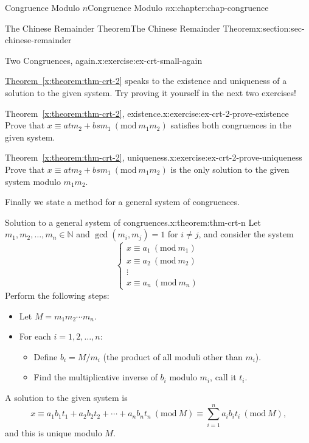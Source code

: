 \documentclass[oneside,10pt,]{book}
\newcommand{\xreffont}{\relax}
\numberwithin{equation}{section}
\newcommand{\Mod}[1]{\ \left(\mathrm{mod}\ #1\right)}
\begin{document}
\begin{chapterptx}{Congruence Modulo \(n\)}{}{Congruence Modulo \(n\)}{}{}{x:chapter:chap-congruence}
\begin{sectionptx}{The Chinese Remainder Theorem}{}{The Chinese Remainder Theorem}{}{}{x:section:sec-chinese-remainder}
\begin{inlineexercise}{Two Congruences, again.}{x:exercise:ex-crt-small-again}
\end{inlineexercise}%
\hyperref[x:theorem:thm-crt-2]{Theorem~{\xreffont\ref{x:theorem:thm-crt-2}}} speaks to the existence and uniqueness of a solution to the given system. Try proving it yourself in the next two exercises!%
\begin{inlineexercise}{Theorem~{\xreffont\ref*{x:theorem:thm-crt-2}}, existence.}{x:exercise:ex-crt-2-prove-existence}%
Prove that \(x \equiv atm_2 + bsm_1 \Mod{m_1m_2}\) satisfies both congruences in the given system.%
\end{inlineexercise}%
\begin{inlineexercise}{Theorem~{\xreffont\ref*{x:theorem:thm-crt-2}}, uniqueness.}{x:exercise:ex-crt-2-prove-uniqueness}%
Prove that \(x \equiv atm_2 + bsm_1 \Mod{m_1m_2}\) is the only solution to the given system modulo \(m_1m_2\).%
\end{inlineexercise}%
Finally we state a method for a general system of congruences.%
\begin{theorem}{Solution to a general system of congruences.}{}{x:theorem:thm-crt-n}%
Let \(m_1,m_2,\ldots,m_n \in \mathbb{N}\) and \(\gcd(m_i,m_j) = 1\) for \(i \ne j\), and consider the system%
\begin{equation*}
\begin{cases} x \equiv a_1 \Mod{m_1} \\ x \equiv a_2 \Mod{m_2} \\ \vdots \\ x \equiv a_n \Mod{m_n} \end{cases}
\end{equation*}
Perform the following steps:%
\begin{itemize}[label=\textbullet]
\item{}Let \(M = m_1m_2\cdots m_n\).%
\item{}For each \(i = 1,2,\ldots,n\):%
\begin{itemize}[label=$\circ$]
\item{}Define \(b_i = M/m_i\) (the product of all moduli other than \(m_i\)).%
\item{}Find the multiplicative inverse of \(b_i\) modulo \(m_i\), call it \(t_i\).%
\end{itemize}
%
\end{itemize}
A solution to the given system is%
\begin{equation*}
x \equiv a_1b_1t_1 + a_2b_2t_2 + \cdots + a_nb_nt_n \Mod{M}\equiv \sum_{i=1}^n a_ib_it_i \Mod{M}\text{,}
\end{equation*}
and this is unique modulo \(M\).%

\end{theorem}
\end{sectionptx}
\end{chapterptx}
\end{document}
